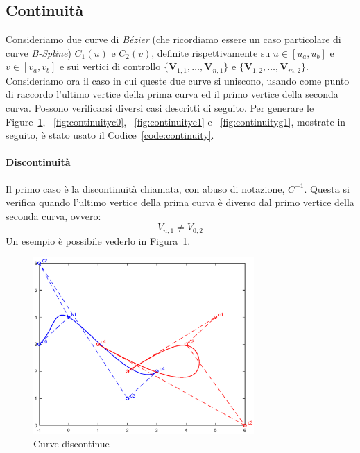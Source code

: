 \documentclass[a4paper, 12pt]{article}
\begin{document}
\subsection{Continuità}
Consideriamo due curve di \textit{Bézier} (che ricordiamo essere un caso particolare di curve \textit{B-Spline}) $C_1(u)$ e $C_2(v)$, definite rispettivamente su $u \in [u_a, u_b]$ e $v \in [v_a, v_b]$ e sui
vertici di controllo $\{\mathbf{V}_{1,1},\dots, \mathbf{V}_{n,1}\}$ e $\{\mathbf{V}_{1,2},\dots, \mathbf{V}_{m,2}\}$. 
Consideriamo ora il caso in cui queste due curve si uniscono, usando come punto di raccordo l'ultimo vertice della prima curva
ed il primo vertice della seconda curva. Possono verificarsi diversi casi descritti di seguito. 
Per generare le Figure~\ref{fig:discontinuity}, ~\ref{fig:continuityc0},  ~\ref{fig:continuityc1} e ~\ref{fig:continuityg1}, mostrate in seguito, è stato usato il Codice~\ref{code:continuity}.


\paragraph{Discontinuità}
Il primo caso è la discontinuità chiamata, con abuso di notazione, $C^{-1}$. Questa si verifica
quando l'ultimo vertice della prima curva è diverso dal primo vertice della seconda curva, ovvero:
$$V_{n,1} \neq V_{0, 2}$$
Un esempio è possibile vederlo in Figura~\ref{fig:discontinuity}.
\begin{figure}[]
  \centering
  \includegraphics[width=0.75\textwidth]{figure/discontinuity.eps}
  \caption{Curve discontinue}
  \label{fig:discontinuity}
\end{figure} 
\end{document}
